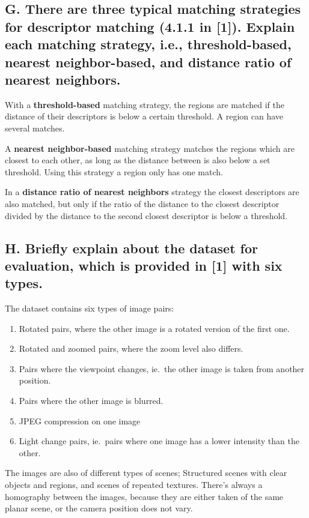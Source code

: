 \subsection{G. There are three typical matching strategies for descriptor
matching (4.1.1 in [1]). Explain each matching strategy, i.e., threshold-based,
nearest neighbor-based, and distance ratio of nearest neighbors.}

With a \textbf{threshold-based} matching strategy, the regions are matched if
the distance of their descriptors is below a certain threshold. A region can
have several matches.

A \textbf{nearest neighbor-based} matching strategy matches the regions which
are closest to each other, as long as the distance between is also below a set
threshold. Using this strategy a region only has one match.

In a \textbf{distance ratio of nearest neighbors} strategy the closest
descriptors are also matched, but only if the ratio of the distance to the
closest descriptor divided by the distance to the second closest descriptor is
below a threshold.

\subsection{H. Briefly explain about the dataset for evaluation, which is
provided in [1] with six types.}

The dataset contains six types of image pairs:
\begin{enumerate}

  \item Rotated pairs, where the other image is a rotated version of the first
    one.

  \item Rotated and zoomed pairs, where the zoom level also differs.

  \item Pairs where the viewpoint changes, ie.\ the other image is taken from
    another position.

  \item Pairs where the other image is blurred.

  \item JPEG compression on one image

  \item Light change pairs, ie.\ pairs where one image has a lower intensity
    than the other.

\end{enumerate}
The images are also of different types of scenes; Structured scenes with clear
objects and regions, and scenes of repeated textures. There's always a
homography between the images, because they are either taken of the same planar
scene, or the camera position does not vary.



